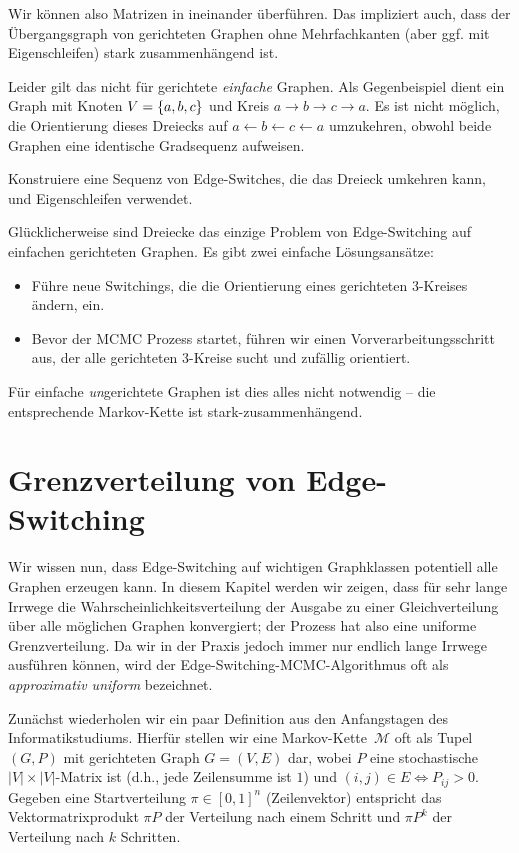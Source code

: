 Wir können also Matrizen in \msz ineinander überführen.
Das impliziert auch, dass der Übergangsgraph von gerichteten Graphen ohne Mehrfachkanten (aber ggf. mit Eigenschleifen) stark zusammenhängend ist.

Leider gilt das nicht für gerichtete \emph{einfache} Graphen.
Als Gegenbeispiel dient ein Graph mit Knoten $V = \left\{a,b,c\right\}$ und Kreis $a \to b \to c \to a$.
Es ist nicht möglich, die Orientierung dieses Dreiecks auf $a \leftarrow b \leftarrow c \leftarrow a$ umzukehren, obwohl beide Graphen eine identische Gradsequenz aufweisen.

\begin{exercise}
    Konstruiere eine Sequenz von Edge-Switches, die das Dreieck umkehren kann, und Eigenschleifen verwendet.
\end{exercise}

Glücklicherweise sind Dreiecke das einzige Problem von Edge-Switching auf einfachen gerichteten Graphen.
Es gibt zwei einfache Lösungsansätze:
\begin{itemize}
    \item Führe neue Switchings, die die Orientierung eines gerichteten 3-Kreises ändern, ein.
    \item Bevor der MCMC Prozess startet, führen wir einen Vorverarbeitungsschritt aus, der alle gerichteten 3-Kreise sucht und zufällig orientiert.
\end{itemize}

Für einfache \emph{un}gerichtete Graphen ist dies alles nicht notwendig -- die entsprechende Markov-Kette ist stark-zusammenhängend.

\section{Grenzverteilung von Edge-Switching}
Wir wissen nun, dass Edge-Switching auf wichtigen Graphklassen potentiell alle Graphen erzeugen kann.
In diesem Kapitel werden wir zeigen, dass für sehr lange Irrwege die Wahrscheinlichkeitsverteilung der Ausgabe zu einer Gleichverteilung über alle möglichen Graphen konvergiert;
der Prozess hat also eine uniforme Grenzverteilung.
Da wir in der Praxis jedoch immer nur endlich lange Irrwege ausführen können, wird der Edge-Switching-MCMC-Algorithmus oft als \emph{approximativ uniform} bezeichnet.

Zunächst wiederholen wir ein paar Definition aus den Anfangstagen des Informatikstudiums.
Hierfür stellen wir eine Markov-Kette~$\mathcal M$ oft als Tupel $(G, P)$ mit gerichteten Graph $G = (V, E)$ dar, wobei $P$ eine stochastische $|V| \times |V|$-Matrix ist (d.h., jede Zeilensumme ist $1$) und $(i, j) \in E \Leftrightarrow P_{ij} > 0$.
Gegeben eine Startverteilung $\pi \in [0, 1]^n$ (Zeilenvektor) entspricht das Vektormatrixprodukt $\pi P$ der Verteilung nach einem Schritt und $\pi P^k$ der Verteilung nach $k$ Schritten.

